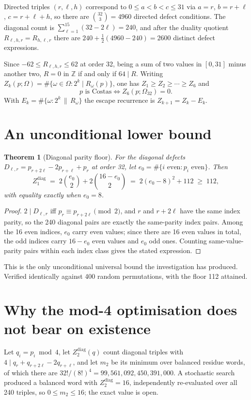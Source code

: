 \documentclass[11pt,a4paper,oneside]{report}
\newtheorem{theorem}{Theorem}[chapter]
\theoremstyle{definition}
\newcommand{\Z}{\mathbb{Z}}
\begin{document}
Directed triples $(r,\ell,h)$ correspond to $0\le a<b<c\le31$ via $a=r$,
$b=r+\ell$, $c=r+\ell+h$, so there are $\binom{32}{3}=4960$ directed defect
conditions. The diagonal count is $\sum_{\ell=1}^{15}(32-2\ell)=240$, and after
the duality quotient $R_{\ell,h,r}=R_{h,\ell,r}$ there are
$240+\tfrac12(4960-240)=2600$ distinct defect expressions.

Since $-62\le R_{\ell,h,r}\le62$ at order 32, being a sum of two values in $[0,31]$ minus another two, $R=0$ in $\Z$ if and only if
$64\mid R$. Writing $Z_k(p;\Omega)=\#\{\omega\in\Omega : 2^k\mid R_\omega(p)\}$,
one has $Z_1\ge Z_2\ge\cdots\ge Z_6$ and
\[
p \text{ is Costas} \iff Z_6(p;\Omega_{32})=0 .
\]
With $E_k=\#\{\omega : 2^k\,\|\,R_\omega\}$ the escape recurrence is
$Z_{k+1}=Z_k-E_k$.

\section{An unconditional lower bound}

\begin{theorem}[Diagonal parity floor]
\label{p7-thm:parityfloor}
For the diagonal defects $D_{\ell,r}=p_{r+2\ell}-2p_{r+\ell}+p_r$ at order 32,
let $e_0=\#\{i \text{ even}: p_i \text{ even}\}$. Then
\[
Z_1^{\mathrm{diag}} \;=\; 2\binom{e_0}{2}+2\binom{16-e_0}{2}
\;=\; 2(e_0-8)^2+112 \;\ge\; 112,
\]
with equality exactly when $e_0=8$.
\end{theorem}
\begin{proof}
$2\mid D_{\ell,r}$ iff $p_r\equiv p_{r+2\ell}\pmod2$, and $r$ and $r+2\ell$ have
the same index parity, so the 240 diagonal pairs are exactly the same-parity
index pairs. Among the 16 even indices, $e_0$ carry even values; since there are
16 even values in total, the odd indices carry $16-e_0$ even values and $e_0$ odd
ones. Counting same-value-parity pairs within each index class gives the stated
expression.
\end{proof}

This is the only unconditional universal bound the investigation has produced.
Verified identically against 400 random permutations, with the floor 112
attained.

\section{Why the mod-4 optimisation does not bear on existence}

Let $q_i=p_i\bmod4$, let $Z_2^{\mathrm{diag}}(q)$ count diagonal triples with
$4\mid q_r+q_{r+2\ell}-2q_{r+\ell}$, and let $m_2$ be its minimum over balanced
residue words, of which there are $32!/(8!)^4 = 99{,}561{,}092{,}450{,}391{,}000$.
A stochastic search produced a balanced word with $Z_2^{\mathrm{diag}}=16$,
independently re-evaluated over all 240 triples, so $0\le m_2\le16$; the exact
value is open.
\end{document}
